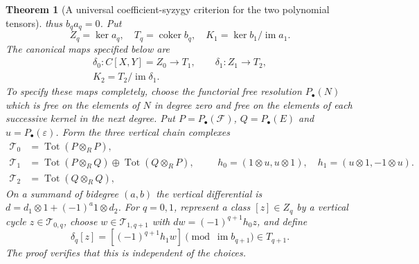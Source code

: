 \documentclass[11pt,a4paper]{article}
\newtheorem{theorem}{Theorem}[section]
\theoremstyle{definition}
\begin{document}
\begin{theorem}[A universal coefficient-syzygy criterion for the two polynomial tensors]
thus $b_qa_q=0$. Put
\begin{equation}
 Z_q=\ker a_q,\quad T_q=\operatorname{coker}b_q,\quad
 K_1=\ker b_1/\operatorname{im}a_1.                       \label{equation-54}
\end{equation}
The canonical maps specified below are
\begin{equation}
\begin{gathered}
 \delta_0:C[X,Y]=Z_0\longrightarrow T_1,
 \qquad \delta_1:Z_1\longrightarrow T_2,\\
 K_2=T_2/\operatorname{im}\delta_1.
\end{gathered}                                           \label{equation-55}
\end{equation}
To specify these maps completely, choose the functorial free
resolution $P_\bullet(N)$ which is free on the elements of $N$ in
degree zero and free on the elements of each successive kernel in the
next degree. Put $P=P_\bullet(\mathcal F)$, $Q=P_\bullet(E)$ and
$u=P_\bullet(\varepsilon)$. Form the three vertical chain complexes
\[
\begin{split}
 \mathcal T_0&=\operatorname{Tot}(P\otimes_R P),\\
 \mathcal T_1&=\operatorname{Tot}(P\otimes_R Q)
                    \oplus\operatorname{Tot}(Q\otimes_R P),\\
 \mathcal T_2&=\operatorname{Tot}(Q\otimes_R Q),
\end{split}
\qquad
 h_0=(1\otimes u,u\otimes1),\quad h_1=(u\otimes1,-1\otimes u).
\]
On a summand of bidegree $(a,b)$ the vertical differential is
$d=d_1\otimes1+(-1)^a1\otimes d_2$. For $q=0,1$, represent a class
$[z]\in Z_q$ by a vertical cycle $z\in\mathcal T_{0,q}$, choose
$w\in\mathcal T_{1,q+1}$ with $dw=(-1)^{q+1}h_0z$, and define
\[
 \delta_q[z]=[(-1)^{q+1}h_1w]
       \pmod{\operatorname{im}b_{q+1}}\in T_{q+1}.
\]
The proof verifies that this is independent of the choices.


\end{theorem}
\end{document}
